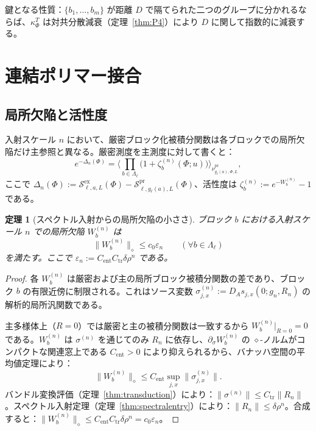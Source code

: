 \documentclass[12pt]{article}
\theoremstyle{plain}
\newtheorem{theorem}{定理}[section]
\theoremstyle{definition}
\numberwithin{equation}{section}
\newcommand{\pr}{\mathrm{pr}}
\newcommand{\ex}{\mathrm{ex}}
\newcommand{\tr}{\mathrm{tr}}
\begin{document}
鍵となる性質：$\{b_1,\ldots,b_m\}$ が距離 $D$ で隔てられた二つのグループに分かれるならば、$\kappa_\Phi^T$ は対共分散減衰（定理~\ref{thm:P4}）により $D$ に関して指数的に減衰する。


\section{連結ポリマー接合}\label{sec:polymer}

\subsection{局所欠陥と活性度}

入射スケール $n$ において、厳密ブロック化被積分関数は各ブロックでの局所欠陥だけ主参照と異なる。厳密測度を主測度に対して書くと：
\begin{equation}
e^{-\Delta_n(\Phi)} = \Big\langle\prod_{b\in\Lambda_\ell}\bigl(1+\zeta_b^{(n)}(\Phi;u)\bigr)\Big\rangle_{\nu^{\pr}_{g_\ell(a),\Phi,L}},
\end{equation}
ここで $\Delta_n(\Phi):=\mathcal{S}^{\ex}_{\ell,a,L}(\Phi)-\mathcal{S}^{\pr}_{\ell,g_\ell(a),L}(\Phi)$、活性度は $\zeta_b^{(n)}:=e^{-W_b^{(n)}}-1$ である。

\begin{theorem}[スペクトル入射からの局所欠陥の小ささ]\label{thm:defectsmall}
ブロック $b$ における入射スケール $n$ での局所欠陥 $W_b^{(n)}$ は
\begin{equation}
\|W_b^{(n)}\|_\diamond \leq c_0\varepsilon_n \qquad(\forall b\in\Lambda_\ell)
\end{equation}
を満たす。ここで $\varepsilon_n:=C_{\mathrm{ent}}C_{\tr}\delta\rho^n$ である。
\end{theorem}

\begin{proof}
各 $W_b^{(n)}$ は厳密および主の局所ブロック被積分関数の差であり、ブロック $b$ の有限近傍に制限される。これはソース変数 $\sigma_{j,x}^{(n)}:=D_A s_{j,x}(0;g_n,R_n)$ の解析的局所汎関数である。

主多様体上（$R=0$）では厳密と主の被積分関数は一致するから $W_b^{(n)}|_{R=0}=0$ である。$W_b^{(n)}$ は $\sigma^{(n)}$ を通じてのみ $R_n$ に依存し、$\partial_\sigma W_b^{(n)}$ の $\diamond$-ノルムがコンパクトな関連窓上である $C_{\mathrm{ent}}>0$ により抑えられるから、バナッハ空間の平均値定理により：
\begin{equation}
\|W_b^{(n)}\|_\diamond \leq C_{\mathrm{ent}}\sup_{j,x}\|\sigma_{j,x}^{(n)}\|.
\end{equation}
バンドル変換評価（定理~\ref{thm:transduction}）により：$\|\sigma^{(n)}\|\leq C_{\tr}\|R_n\|$。スペクトル入射定理（定理~\ref{thm:spectralentry}）により：$\|R_n\|\leq\delta\rho^n$。合成すると：$\|W_b^{(n)}\|_\diamond\leq C_{\mathrm{ent}}C_{\tr}\delta\rho^n=c_0\varepsilon_n$。
\end{proof}
\end{document}
